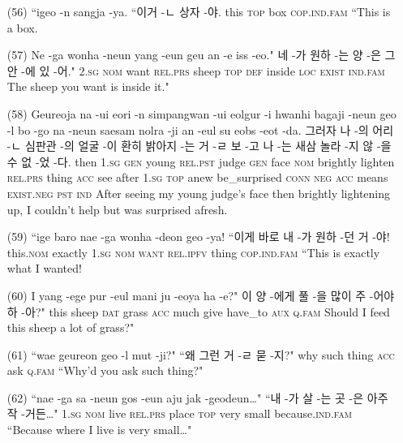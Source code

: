 \begin{itemize}
\item [(56)]
\tgl
		{``igeo -n sangja -ya.}
		{``이거 -ㄴ 상자 -야.}
		{this	\textsc{top}	box	\textsc{cop.ind.fam}}
		{``This is a box.}

\item [(57)]
\tgl
		{Ne -ga wonha -neun yang -eun geu an -e iss -eo."}
		{네 -가 원하 -는 양 -은 그 안 -에 있 -어."}
		{\textsc{2.sg}	\textsc{nom}	want	\textsc{rel.prs}	sheep	\textsc{top}	\textsc{def}	inside	\textsc{loc}	\textsc{exist}	\textsc{ind.fam}}
		{The sheep you want is inside it."}
		
\item [(58)]
\tgl
		{Geureoja na -ui eori -n simpangwan -ui eolgur -i hwanhi bagaji -neun geo -l bo -go na -neun saesam nolra -ji an -eul su eobs -eot -da.}
		{그러자 나 -의 어리 -ㄴ 심판관 -의 얼굴 -이 환히 밝아지 -는 거 -ㄹ 보 -고 나 -는 새삼 놀라 -지 않 -을 수 없 -었 -다.}
		{then	\textsc{1.sg}	\textsc{gen}	young	\textsc{rel.pst}	judge	\textsc{gen}	face	\textsc{nom}	brightly	lighten	\textsc{rel.prs}	thing	\textsc{acc}	see	after	\textsc{1.sg}	\textsc{top}	anew	be\_surprised	\textsc{conn}	\textsc{neg}	\textsc{acc}	means	\textsc{exist.neg}	\textsc{pst}	\textsc{ind}}
		{After seeing my young judge's face then brightly lightening up, I couldn't help but was surprised afresh.}
		
\item [(59)]
\tgl
		{``ige baro nae -ga wonha -deon geo -ya!}
		{``이게 바로 내 -가 원하 -던 거 -야!}
		{this.\textsc{nom}	exactly	\textsc{1.sg}	\textsc{nom}	\textsc{want}	\textsc{rel.ipfv}	thing	\textsc{cop.ind.fam}}
		{``This is exactly what I wanted!}

\item [(60)]
\tgl
		{I yang -ege pur -eul mani ju -eoya ha -e?"}
		{이 양 -에게 풀 -을 많이 주 -어야 하 -아?"}
		{this	sheep	\textsc{dat}	grass	\textsc{acc}	much	give	have\_to	\textsc{aux}	\textsc{q.fam}}
		{Should I feed this sheep a lot of grass?"}

\item [(61)]
\tgl
		{``wae geureon geo -l mut -ji?"}
		{``왜 그런 거 -ㄹ 묻 -지?"}
		{why	such	thing	\textsc{acc}	ask	\textsc{q.fam}}
		{``Why'd you ask such thing?"}
		
\item [(62)]
\tgl
		{``nae -ga sa -neun gos -eun aju jak -geodeun…"}
		{``내 -가 살 -는 곳 -은 아주 작 -거든…"}
		{\textsc{1.sg}	\textsc{nom}	live	\textsc{rel.prs}	place	\textsc{top}	very	small	because.\textsc{ind.fam}}
		{``Because where I live is very small…"}


\end{itemize}
